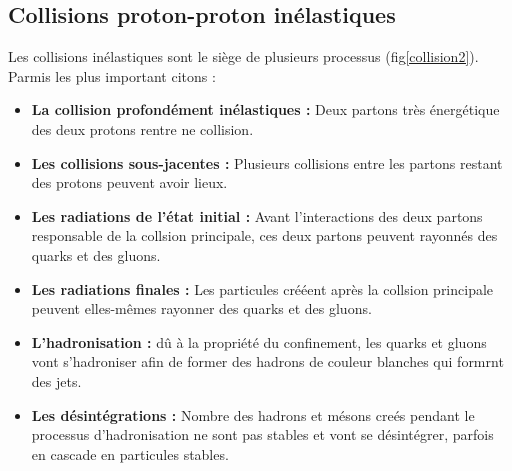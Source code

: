 \subsection{Collisions proton-proton inélastiques}
Les collisions inélastiques sont le siège de plusieurs processus (fig\ref{collision2}). Parmis les plus important citons :
\begin{itemize}[label=$\bullet$]
	\item \textbf{La collision profondément inélastiques :} Deux partons très énergétique des deux protons rentre ne collision.
	\item \textbf{Les collisions sous-jacentes :} Plusieurs collisions entre les partons restant des protons peuvent avoir lieux.
	\item \textbf{Les radiations de l'état initial :} Avant l'interactions des deux partons responsable de la collsion principale, ces deux partons peuvent rayonnés des quarks et des gluons.
	\item \textbf{Les radiations finales :} Les particules crééent après la collsion principale peuvent elles-mêmes rayonner des quarks et des gluons.
	\item \textbf{L'hadronisation :} dû à la propriété du confinement, les quarks et gluons vont s'hadroniser afin de former des hadrons de couleur blanches qui formrnt des jets.
	\item \textbf{Les désintégrations :} Nombre des hadrons et mésons creés pendant le processus d'hadronisation ne sont pas stables et vont se désintégrer, parfois en cascade en particules stables.
\end{itemize}

